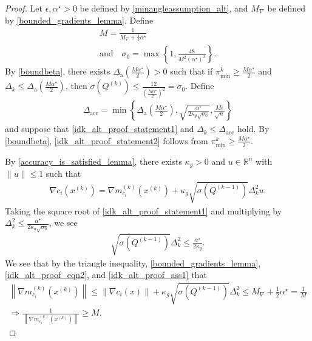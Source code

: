 \documentclass{article}
\theoremstyle{case}
\numberwithin{theorem}{subsection}
\newcommand{\dacc}{{\Delta_{\textrm{acc}}}}
\newcommand{\dacco}{{\Delta_{\textrm{a}}}}
\newcommand{\dk}{\Delta_k}
\newcommand{\gmcik}{{\nabla m_{c_i}^{(k)}\left(\xk\right)}}
\newcommand{\gradf}{\nabla f}
\newcommand{\maxgrad}{{M_{\nabla}}}
\newcommand{\mfk}{{{m}_f}^{(k)}}
\newcommand{\minanglealpha}{{ \alpha^{\star} }}
\newcommand{\qk}{{Q^{(k)}}}
\newcommand{\Rn}{\mathbb R^n}
\newcommand{\thetamink}{{\pi^k_{\textrm{min}}}}
\newcommand{\tr}{{ B_{\infty}\left(\xk, \dk\right) }}
\newcommand{\xk}{x^{(k)}}
\newcommand{\epsactive}{{\mathbb A_c}}
\begin{document}
\begin{proof}
Let $\epsilon, \minanglealpha > 0$ be defined by \cref{minangleassumption_alt}, and $\maxgrad$ be defined by \cref{bounded_gradients_lemma}.
Define
\begin{align}
&M = \frac 1 {\maxgrad + \frac 1 2 \minanglealpha} & \\
&\textrm{and} \quad \sigma_0 = \max\left\{1, \frac{48}{M^2\left(\minanglealpha\right)^2}\right\}.&
\end{align}
By \cref{boundbeta}, there exists $\dacco \left(\frac {M \minanglealpha} 2\right) > 0$ such that if
$\thetamink \ge \frac {M \minanglealpha} 2$ and $\dk \le \dacco \left(\frac {M \minanglealpha} 2\right)$,
then $\sigma\left(\qk\right) \le \frac{12}{\left(\frac{M\minanglealpha}{2}\right)^2} = \sigma_0$.
Define 
\begin{align}
\dacc = \min\left\{
\dacco \left(\frac {M \minanglealpha} 2\right), 
\sqrt{\frac {\minanglealpha}{2\kappa_g\sqrt{\sigma_0}}},
\frac{M \epsilon}{\sqrt{n}}
\right\} \label{define_delta_accuracy2}
\end{align}
and suppose that \cref{idk_alt_proof_statement1} and $\dk \le \dacc$ hold.
By \cref{boundbeta}, \cref{idk_alt_proof_statement2} follows from $\thetamink \ge \frac {M \minanglealpha} 2$.


By \cref{accuracy_is_satisfied_lemma}, there exists $\kappa_{g} > 0$ and $u\in\Rn$ with $\|u\|\le 1$ such that
\begin{align}
\nabla c_i\left(\xk\right) = \gmcik + \kappa_g \sqrt{\sigma\left( Q^{(k-1)} \right)}\dk^2 u. \label{idk_alt_proof_eqn2}
\end{align}
Taking the square root of \cref{idk_alt_proof_statement1} and multiplying by $\dk^2 \le \frac {\minanglealpha}{2\kappa_g\sqrt{\sigma_0}}$, we see
\begin{align}
\sqrt{\sigma\left( Q^{(k-1)} \right)} \dk^2 \le \frac {\minanglealpha} {2\kappa_g}. \label{idk_alt_proof_ass1}
\end{align}
We see that by the triangle inequality, \cref{bounded_gradients_lemma}, \cref{idk_alt_proof_eqn2}, and \cref{idk_alt_proof_ass1} that
\begin{align}
\left\|\gmcik\right\| \le \left\| \nabla c_i\left(x\right)\right\| + \kappa_g \sqrt{\sigma\left( Q^{(k-1)} \right)} \dk^2 \le \maxgrad + \frac 1 2 \minanglealpha = \frac 1 M \nonumber \\
\Longrightarrow \frac 1 {\left\|\gmcik\right\|} \ge M. \label{idk_alt_proof_eqn4}
\end{align}


\end{proof}
\end{document}
